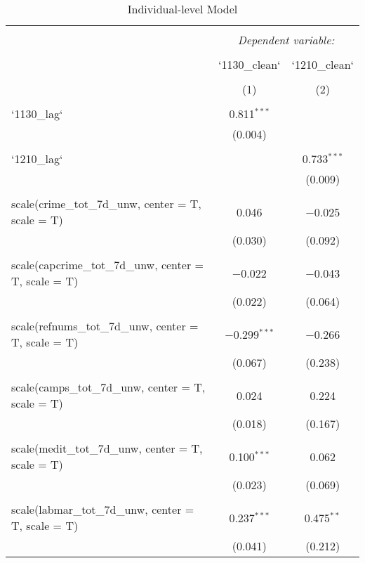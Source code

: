 
\begin{table}[!htbp] \centering 
  \caption{Individual-level Model} 
  \label{} 
\begin{tabular}{@{\extracolsep{5pt}}lcc} 
\\[-1.8ex]\hline 
\hline \\[-1.8ex] 
 & \multicolumn{2}{c}{\textit{Dependent variable:}} \\ 
\cline{2-3} 
\\[-1.8ex] & `1130\_clean` & `1210\_clean` \\ 
\\[-1.8ex] & (1) & (2)\\ 
\hline \\[-1.8ex] 
 `1130\_lag` & 0.811$^{***}$ &  \\ 
  & (0.004) &  \\ 
  & & \\ 
 `1210\_lag` &  & 0.733$^{***}$ \\ 
  &  & (0.009) \\ 
  & & \\ 
 scale(crime\_tot\_7d\_unw, center = T, scale = T) & 0.046 & $-$0.025 \\ 
  & (0.030) & (0.092) \\ 
  & & \\ 
 scale(capcrime\_tot\_7d\_unw, center = T, scale = T) & $-$0.022 & $-$0.043 \\ 
  & (0.022) & (0.064) \\ 
  & & \\ 
 scale(refnums\_tot\_7d\_unw, center = T, scale = T) & $-$0.299$^{***}$ & $-$0.266 \\ 
  & (0.067) & (0.238) \\ 
  & & \\ 
 scale(camps\_tot\_7d\_unw, center = T, scale = T) & 0.024 & 0.224 \\ 
  & (0.018) & (0.167) \\ 
  & & \\ 
 scale(medit\_tot\_7d\_unw, center = T, scale = T) & 0.100$^{***}$ & 0.062 \\ 
  & (0.023) & (0.069) \\ 
  & & \\ 
 scale(labmar\_tot\_7d\_unw, center = T, scale = T) & 0.237$^{***}$ & 0.475$^{**}$ \\ 
  & (0.041) & (0.212) \\ 

\end{tabular}
\end{table}
